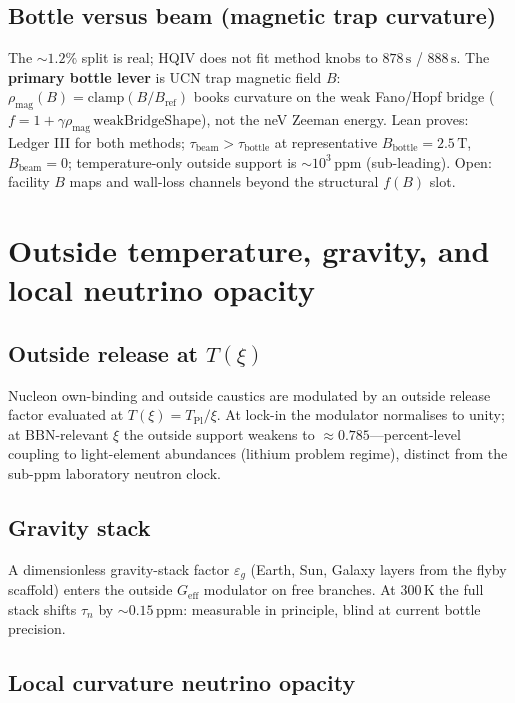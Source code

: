 \documentclass[11pt,a4paper]{article}
\theoremstyle{plain}
\theoremstyle{definition}
\theoremstyle{remark}
\theoremstyle{plain}
\theoremstyle{definition}
\begin{document}
\subsection{Bottle versus beam (magnetic trap curvature)}

The $\sim 1.2\%$ split is real; HQIV does not fit method knobs to $878\,\mathrm{s}$ /
$888\,\mathrm{s}$. The \textbf{primary bottle lever} is UCN trap magnetic field $B$:
$\rho_{\mathrm{mag}}(B)=\mathrm{clamp}(B/B_{\mathrm{ref}})$ books curvature on the weak
Fano/Hopf bridge ($f=1+\gamma\rho_{\mathrm{mag}}\,\mathrm{weakBridgeShape}$), not the neV
Zeeman energy. Lean proves: Ledger III for both methods; $\tau_{\mathrm{beam}}>\tau_{\mathrm{bottle}}$
at representative $B_{\mathrm{bottle}}=2.5\,\mathrm{T}$, $B_{\mathrm{beam}}=0$;
temperature-only outside support is $\sim 10^3\,\mathrm{ppm}$ (sub-leading). Open:
facility $B$ maps and wall-loss channels beyond the structural $f(B)$ slot.

\section{Outside temperature, gravity, and local neutrino opacity}
\label{sec:outside}

\subsection{Outside release at $T(\xi)$}

Nucleon own-binding and outside caustics are modulated by an outside release factor evaluated at $T(\xi)=T_{\mathrm{Pl}}/\xi$.
At lock-in the modulator normalises to unity; at BBN-relevant $\xi$ the outside support weakens to $\approx 0.785$---percent-level coupling to light-element abundances (lithium problem regime), distinct from the sub-ppm laboratory neutron clock.

\subsection{Gravity stack}

A dimensionless gravity-stack factor $\varepsilon_g$ (Earth, Sun, Galaxy layers from the flyby scaffold) enters the outside $G_{\mathrm{eff}}$ modulator on free branches.
At $300\,\mathrm{K}$ the full stack shifts $\tau_n$ by $\sim 0.15\,\mathrm{ppm}$: measurable in principle, blind at current bottle precision.

\subsection{Local curvature neutrino opacity}
\end{document}
